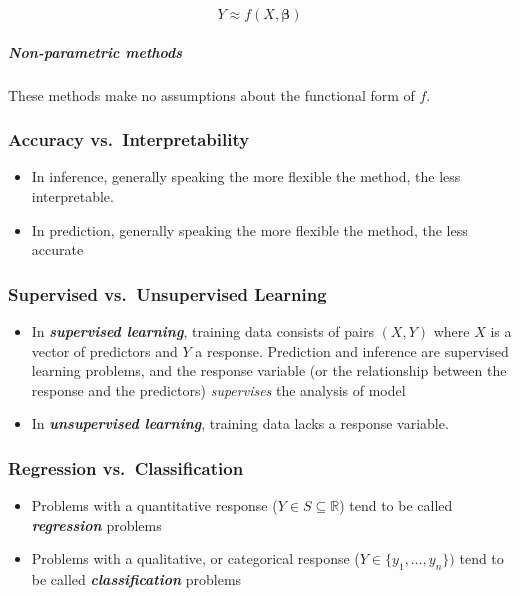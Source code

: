 \documentclass[11pt]{article}
\begin{document}
\[Y \approx f(X, \boldsymbol{\beta})\]

    \hypertarget{non-parametric-methods}{%
\subparagraph{Non-parametric methods}\label{non-parametric-methods}}

    These methods make no assumptions about the functional form of \(f\).

    \hypertarget{accuracy-vs.-interpretability}{%
\subsubsection{Accuracy
vs.~Interpretability}\label{accuracy-vs.-interpretability}}

    \begin{itemize}
\item
  In inference, generally speaking the more flexible the method, the
  less interpretable.
\item
  In prediction, generally speaking the more flexible the method, the
  less accurate
\end{itemize}

    \hypertarget{supervised-vs.-unsupervised-learning}{%
\subsubsection{Supervised vs.~Unsupervised
Learning}\label{supervised-vs.-unsupervised-learning}}

    \begin{itemize}
\item
  In \textbf{\emph{supervised learning}}, training data consists of
  pairs \((X, Y)\) where \(X\) is a vector of predictors and \(Y\) a
  response. Prediction and inference are supervised learning problems,
  and the response variable (or the relationship between the response
  and the predictors) \emph{supervises} the analysis of model
\item
  In \textbf{\emph{unsupervised learning}}, training data lacks a
  response variable.
\end{itemize}

    \hypertarget{regression-vs.-classification}{%
\subsubsection{Regression
vs.~Classification}\label{regression-vs.-classification}}

    \begin{itemize}
\item
  Problems with a quantitative response
  (\(Y\in S \subseteq \mathbb{R}\)) tend to be called
  \textbf{\emph{regression}} problems
\item
  Problems with a qualitative, or categorical response
  (\(Y \in \{y_1, \dots, y_n\})\) tend to be called
  \textbf{\emph{classification}} problems
\end{itemize}
\end{document}
